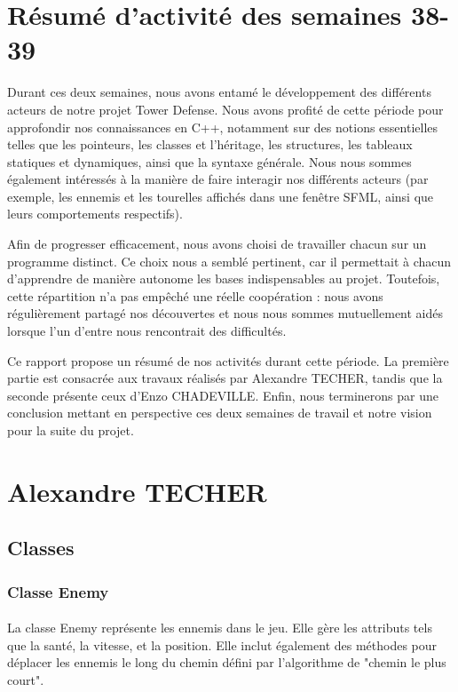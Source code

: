 \section{Résumé d'activité des semaines 38-39}

Durant ces deux semaines, nous avons entamé le développement des différents acteurs de notre projet Tower Defense. Nous avons profité de cette période pour approfondir nos connaissances en C++, notamment sur des notions essentielles telles que les pointeurs, les classes et l’héritage, les structures, les tableaux statiques et dynamiques, ainsi que la syntaxe générale. Nous nous sommes également intéressés à la manière de faire interagir nos différents acteurs (par exemple, les ennemis et les tourelles affichés dans une fenêtre SFML, ainsi que leurs comportements respectifs).

Afin de progresser efficacement, nous avons choisi de travailler chacun sur un programme distinct. Ce choix nous a semblé pertinent, car il permettait à chacun d’apprendre de manière autonome les bases indispensables au projet. Toutefois, cette répartition n’a pas empêché une réelle coopération : nous avons régulièrement partagé nos découvertes et nous nous sommes mutuellement aidés lorsque l’un d’entre nous rencontrait des difficultés.

Ce rapport propose un résumé de nos activités durant cette période. La première partie est consacrée aux travaux réalisés par Alexandre TECHER, tandis que la seconde présente ceux d’Enzo CHADEVILLE. Enfin, nous terminerons par une conclusion mettant en perspective ces deux semaines de travail et notre vision pour la suite du projet.

\section{Alexandre TECHER}
%

\subsection{Classes}

\subsubsection{Classe Enemy}
\paragraph{}
La classe Enemy représente les ennemis dans le jeu. Elle gère les attributs tels que la santé, la vitesse, et la position. Elle inclut également des méthodes pour déplacer les ennemis le long du chemin défini par l'algorithme de "chemin le plus court".

